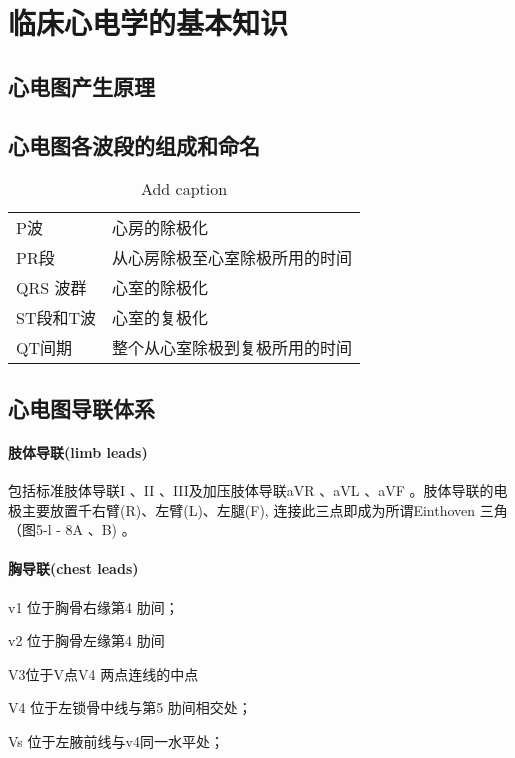 \documentclass[UTF8]{ctexbook}
\begin{document}
\section{临床心电学的基本知识}
\subsection{心电图产生原理}
\subsection{心电图各波段的组成和命名}

\begin{table}[htbp]
    \centering
    \caption{Add caption}
    \begin{tabular}{ll}
        \hline
        P波       & 心房的除极化                   \\
        PR段      & 从心房除极至心室除极所用的时间 \\
        QRS 波群  & 心室的除极化                   \\
        ST段和T波 & 心室的复极化                   \\
        QT间期    & 整个从心室除极到复极所用的时间 \\
        \hline
    \end{tabular}%
    \label{tabel}%
\end{table}%

\subsection{心电图导联体系}
\paragraph{肢体导联(limb leads)}包括标准肢体导联I 、II 、III及加压肢体导联aVR 、aVL 、aVF 。肢体导联的电极主要放置千右臂(R)、左臂(L)、左腿(F), 连接此三点即成为所谓Einthoven 三角（图5-l - 8A 、B) 。
\paragraph{胸导联(chest leads)}

v1 位于胸骨右缘第4 肋间；

v2 位于胸骨左缘第4 肋间

V3位于V点V4 两点连线的中点

V4 位于左锁骨中线与第5 肋间相交处；

Vs 位于左腋前线与v4同一水平处；
\end{document}
